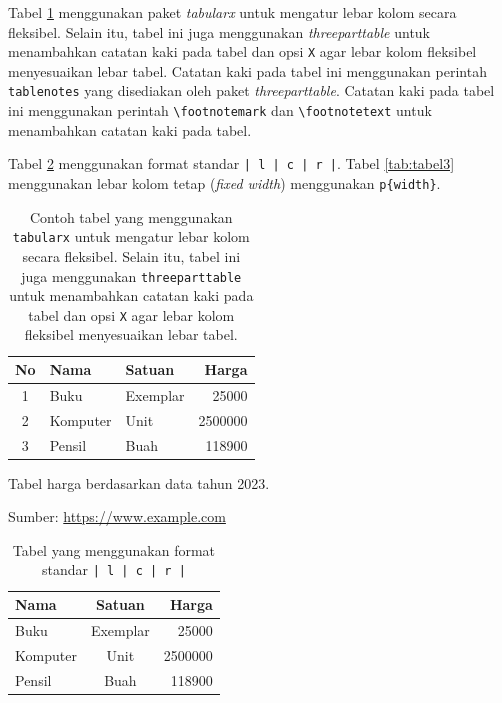 Tabel \ref{tab:tabel1} menggunakan paket \textit{tabularx} untuk mengatur lebar kolom secara fleksibel. 
Selain itu, tabel ini juga menggunakan \textit{threeparttable} untuk menambahkan catatan kaki pada tabel 
dan opsi \texttt{X} agar lebar kolom fleksibel menyesuaikan lebar tabel.
Catatan kaki pada tabel ini menggunakan perintah \texttt{tablenotes} yang disediakan oleh paket \textit{threeparttable}.
Catatan kaki pada tabel ini menggunakan perintah \texttt{\textbackslash footnotemark} dan \texttt{\textbackslash footnotetext} untuk menambahkan catatan kaki pada tabel.

Tabel \ref{tab:tabel2} menggunakan format standar \texttt{| l | c | r |}. 
Tabel \ref{tab:tabel3} menggunakan lebar kolom tetap (\textit{fixed width}) menggunakan \texttt{p\{width\}}.

\begin{table} 
  \centering
    \begin{threeparttable}[t] %
    \caption{Contoh tabel yang menggunakan \texttt{tabularx} untuk mengatur lebar kolom secara fleksibel. 
    Selain itu, tabel ini juga menggunakan \texttt{threeparttable} untuk menambahkan catatan kaki pada tabel 
    dan opsi \texttt{X} agar lebar kolom fleksibel menyesuaikan lebar tabel.}
    \label{tab:tabel1}
    \begin{tabularx}{0.6\textwidth}{| c | X| l | r @{}|} %
	    \hline
	    No & Nama 	& Satuan 		& Harga \\
	    \hline
	    1 & Buku 	& Exemplar	& 25000 \\
	    2 & Komputer	& Unit		& 2500000 \\
	    3 & Pensil	& Buah		& 118900 \\
	    \hline
	  \end{tabularx} 
    \begin{tablenotes}
      \footnotesize
      \item \footnotemark[1]Tabel harga berdasarkan data tahun 2023.
      \item \footnotemark[2]Sumber: \url{https://www.example.com}
    \end{tablenotes}
  \end{threeparttable}
\end{table}




\begin{table}[t] %
  \caption{Tabel yang menggunakan format standar \texttt{| l | c | r |}}
  \label{tab:tabel2}
	\begin{tabular}{ | l | c | r | }
	\hline
	Nama 	& Satuan 		& Harga \\
	\hline
	Buku 	& Exemplar	& 25000 \\
	Komputer	& Unit		& 2500000 \\
	Pensil	& Buah		& 118900 \\
	\hline
	\end{tabular}
\end{table}


